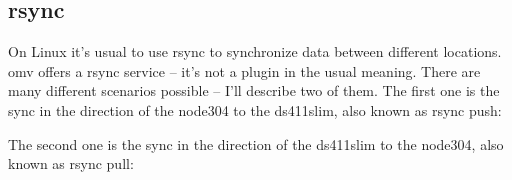 

\subsection{rsync}

On Linux it's usual to use \gls{rsync} to synchronize data between different
locations. \gls{omv} offers a \gls{rsync} service -- it's not a plugin in the
usual meaning. There are many different scenarios possible -- I'll describe
two of them. The first one is the sync in the direction of the \gls{node304} to
the \gls{ds411slim}, also known as rsync push:



The second one is the sync in the direction of the \gls{ds411slim} to
the \gls{node304}, also known as rsync pull:

